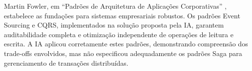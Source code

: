 Martin Fowler, em ``Padrões de Arquitetura de Aplicações Corporativas'' , estabelece as fundações para sistemas empresariais robustos. Os padrões Event Sourcing e CQRS, implementados na solução proposta pela IA, garantem auditabilidade completa e otimização independente de operações de leitura e escrita. A IA aplicou corretamente estes padrões, demonstrando compreensão dos trade-offs envolvidos, mas não especificou adequadamente os padrões Saga para gerenciamento de transações distribuídas.

